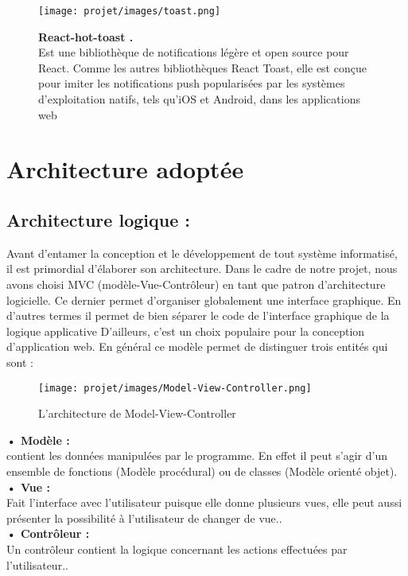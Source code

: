 \vspace{0.5cm}
\begin{figure}[H]
    \centering
    \begin{minipage}[c]{0.3\textwidth}
        \texttt{[image: projet/images/toast.png]}
    \end{minipage}
    \hspace{1cm}
    \begin{minipage}[c]{0.6\textwidth}
        \textbf{React-hot-toast .}\\[0.5em]
    Est une bibliothèque de notifications légère et open source pour React. Comme les autres bibliothèques React Toast, elle est conçue pour imiter les notifications push popularisées par les systèmes d'exploitation natifs, tels qu'iOS et Android, dans les applications web \cite{ref26}
    \end{minipage}
\end{figure}
\section{Architecture adoptée}
\subsection{Architecture logique :}
Avant d’entamer la conception et le développement de tout système informatisé, il est primordial d’élaborer son architecture.  Dans le cadre de notre projet,
nous avons choisi MVC (modèle-Vue-Contrôleur) en tant que patron d’architecture logicielle. Ce dernier permet d’organiser globalement une interface
graphique. En d’autres termes il permet de bien séparer le code de l’interface
graphique de la logique applicative D’ailleurs, c’est un choix populaire pour la
conception d’application web. En général ce modèle permet de distinguer trois
entités qui sont :
\begin{figure}[H]
    \centering
    \texttt{[image: projet/images/Model-View-Controller.png]}
    \caption{L’architecture de Model-View-Controller}
    \label{fig:equipe_scrum}
\end{figure}

\textbf{• Modèle :}\\
contient les données manipulées par le programme. En effet il peut s’agir
d’un ensemble de fonctions (Modèle procédural) ou de classes (Modèle
orienté objet).\\
\textbf{ • Vue :}\\
Fait l’interface avec l’utilisateur puisque elle donne plusieurs vues, elle
peut aussi présenter la possibilité à l’utilisateur de changer de vue..\\
\textbf{• Contrôleur :}\\
Un contrôleur contient la logique concernant les actions effectuées par
l’utilisateur..
